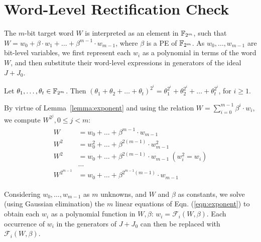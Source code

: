 \section{Word-Level Rectification Check}\label{sec:rcheck}


The $m$-bit target word $W$ is interpreted as an element in ${\mathbb{F}}_{2^m}$,
such that $W = w_0 + \beta \cdot w_1 + \dots + \beta^{m-1} \cdot
w_{m-1}$,   
where $\beta$ is a PE of ${\mathbb{F}}_{2^m}$. As $w_0,\dots,w_{m-1}$ are bit-level variables, we first
represent each $w_i$ as a polynomial in terms of the word $W$, and
then substitute their word-level expressions in generators of the
ideal $J+J_0$. 

\begin{Lemma}
  \label{lemma:exponent}
Let $\theta_1,\dots,\theta_t \in {\mathbb{F}}_{2^m}$. Then $(\theta_1+\theta_2+\dots+\theta_t)^{2^i} =
\theta_1^{2^i}+\theta_2^{2^i}+\dots+\theta_t^{2^i}$, for $i\geq 1$.
\end{Lemma}
By virtue of Lemma~\ref{lemma:exponent} and using the relation $W = \sum_{i=0}^{m-1}\beta^i \cdot w_i$, 
we compute $W^{2^j}, 0\leq j < m$: 
\begin{eqnarray}\label{eqn:exponent}
  \begin{aligned}
    W & = w_0 + \dots + \beta^{m-1} \cdot w_{m-1}\\
    W^2 & = w_0^2 + \dots + \beta^{2(m-1)}\cdot w_{m-1}^2\\
    W^2 & = w_0 + \dots + \beta^{2(m-1)} \cdot w_{m-1}
    ~(w_i^2=w_i)\\
    & \dots \\
    W^{2^{m-1}} & = w_0 + \dots + \beta^{2^{m-1}(m-1)}\cdot w_{m-1}
  \end{aligned}
\end{eqnarray}

Considering $w_0,\dots,w_{m-1}$ as $m$ unknowns, and $W$ and $\beta$
as constants, we solve (using Gaussian elimination) the
$m$ linear equations of Eqn. (\ref{eqn:exponent}) to obtain each $w_i$
as a polynomial function in $W, \beta$: $w_i =
\mathcal{F}_i(W,\beta)$. Each occurrence of $w_i$ in the generators of
$J+J_0$ can then be replaced with $\mathcal{F}_i(W,\beta)$. 

